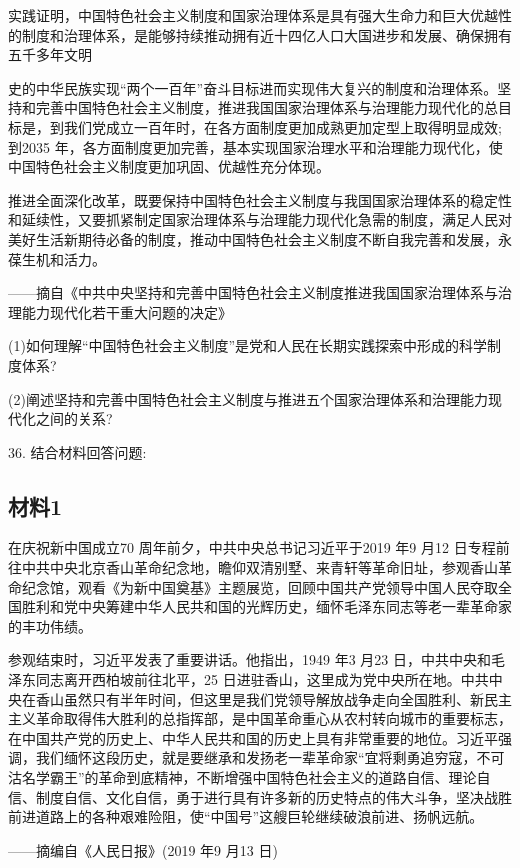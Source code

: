 \documentclass[UTF8,11pt]{ctexart}
\begin{document}
实践证明，中国特色社会主义制度和国家治理体系是具有强大生命力和巨大优越性的制度和治理体系，是能够持续推动拥有近十四亿人口大国进步和发展、确保拥有五千多年文明

史的中华民族实现“两个一百年”奋斗目标进而实现伟大复兴的制度和治理体系。坚持和完善中国特色社会主义制度，推进我国国家治理体系与治理能力现代化的总目标是，到我们党成立一百年时，在各方面制度更加成熟更加定型上取得明显成效;到2035 年，各方面制度更加完善，基本实现国家治理水平和治理能力现代化，使中国特色社会主义制度更加巩固、优越性充分体现。

推进全面深化改革，既要保持中国特色社会主义制度与我国国家治理体系的稳定性和延续性，又要抓紧制定国家治理体系与治理能力现代化急需的制度，满足人民对美好生活新期待必备的制度，推动中国特色社会主义制度不断自我完善和发展，永葆生机和活力。

——摘自《中共中央坚持和完善中国特色社会主义制度推进我国国家治理体系与治理能力现代化若干重大问题的决定》

(1)如何理解“中国特色社会主义制度”是党和人民在长期实践探索中形成的科学制度体系?


(2)阐述坚持和完善中国特色社会主义制度与推进五个国家治理体系和治理能力现代化之间的关系?


36. 结合材料回答问题:


\subsection*{材料1}

在庆祝新中国成立70 周年前夕，中共中央总书记习近平于2019 年9 月12 日专程前往中共中央北京香山革命纪念地，瞻仰双清别墅、来青轩等革命旧址，参观香山革命纪念馆，观看《为新中国奠基》主题展览，回顾中国共产党领导中国人民夺取全国胜利和党中央筹建中华人民共和国的光辉历史，缅怀毛泽东同志等老一辈革命家的丰功伟绩。

参观结束时，习近平发表了重要讲话。他指出，1949 年3 月23 日，中共中央和毛泽东同志离开西柏坡前往北平，25 日进驻香山，这里成为党中央所在地。中共中央在香山虽然只有半年时间，但这里是我们党领导解放战争走向全国胜利、新民主主义革命取得伟大胜利的总指挥部，是中国革命重心从农村转向城市的重要标志，在中国共产党的历史上、中华人民共和国的历史上具有非常重要的地位。习近平强调，我们缅怀这段历史，就是要继承和发扬老一辈革命家“宜将剩勇追穷寇，不可沽名学霸王”的革命到底精神，不断增强中国特色社会主义的道路自信、理论自信、制度自信、文化自信，勇于进行具有许多新的历史特点的伟大斗争，坚决战胜前进道路上的各种艰难险阻，使“中国号”这艘巨轮继续破浪前进、扬帆远航。

——摘编自《人民日报》(2019 年9 月13 日)
\end{document}
